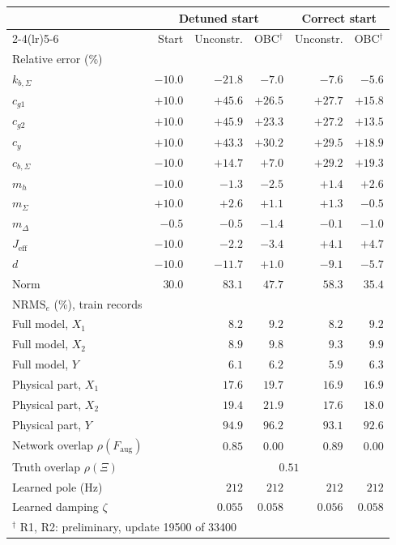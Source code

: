 \setlength{\tabcolsep}{3pt}
\begin{tabular}{l r r r r r}
\toprule
 & \multicolumn{3}{c}{Detuned start} & \multicolumn{2}{c}{Correct start}\\
\cmidrule(lr){2-4}\cmidrule(lr){5-6}
 & Start & Unconstr. & OBC$^\dagger$ & Unconstr. & OBC$^\dagger$\\
\midrule
\multicolumn{6}{l}{Relative error (\%)}\\
$k_{b,\Sigma}$ & $-10.0$ & $-21.8$ & $-7.0$ & $-7.6$ & $-5.6$\\
$c_{g1}$ & $+10.0$ & $+45.6$ & $+26.5$ & $+27.7$ & $+15.8$\\
$c_{g2}$ & $+10.0$ & $+45.9$ & $+23.3$ & $+27.2$ & $+13.5$\\
$c_y$ & $+10.0$ & $+43.3$ & $+30.2$ & $+29.5$ & $+18.9$\\
$c_{b,\Sigma}$ & $-10.0$ & $+14.7$ & $+7.0$ & $+29.2$ & $+19.3$\\
$m_h$ & $-10.0$ & $-1.3$ & $-2.5$ & $+1.4$ & $+2.6$\\
$m_\Sigma$ & $+10.0$ & $+2.6$ & $+1.1$ & $+1.3$ & $-0.5$\\
$m_\Delta$ & $-0.5$ & $-0.5$ & $-1.4$ & $-0.1$ & $-1.0$\\
$J_{\mathrm{eff}}$ & $-10.0$ & $-2.2$ & $-3.4$ & $+4.1$ & $+4.7$\\
$d$ & $-10.0$ & $-11.7$ & $+1.0$ & $-9.1$ & $-5.7$\\
Norm & $30.0$ & $83.1$ & $47.7$ & $58.3$ & $35.4$\\
\midrule
\multicolumn{6}{l}{$\mathrm{NRMS}_e$ (\%), train records}\\
Full model, $X_1$ &  & $8.2$ & $9.2$ & $8.2$ & $9.2$\\
Full model, $X_2$ &  & $8.9$ & $9.8$ & $9.3$ & $9.9$\\
Full model, $Y$ &  & $6.1$ & $6.2$ & $5.9$ & $6.3$\\
Physical part, $X_1$ &  & $17.6$ & $19.7$ & $16.9$ & $16.9$\\
Physical part, $X_2$ &  & $19.4$ & $21.9$ & $17.6$ & $18.0$\\
Physical part, $Y$ &  & $94.9$ & $96.2$ & $93.1$ & $92.6$\\
\midrule
Network overlap $\rho(F_{\mathrm{aug}})$ &  & $0.85$ & $0.00$ & $0.89$ & $0.00$\\
Truth overlap $\rho(\Xi)$ & & \multicolumn{4}{c}{$0.51$}\\
Learned pole (Hz) &  & $212$ & $212$ & $212$ & $212$\\
Learned damping $\zeta$ &  & $0.055$ & $0.058$ & $0.056$ & $0.058$\\
\bottomrule
\multicolumn{6}{l}{\footnotesize $^\dagger$ R1, R2: preliminary, update 19500 of 33400}\\
\end{tabular}
